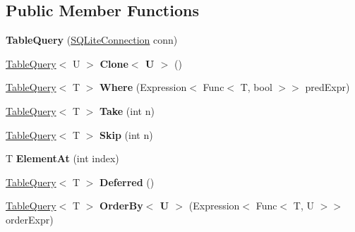 \subsection*{Public Member Functions}
\begin{DoxyCompactItemize}
\item 
\hypertarget{classSQLite_1_1TableQuery_a2e3874f45af10a8c44db821c7a848aab}{}{\bfseries Table\+Query} (\hyperlink{classSQLite_1_1SQLiteConnection}{S\+Q\+Lite\+Connection} conn)\label{classSQLite_1_1TableQuery_a2e3874f45af10a8c44db821c7a848aab}

\item 
\hypertarget{classSQLite_1_1TableQuery_a744de6c9fda8bf39de015ae41c0b2cb3}{}\hyperlink{classSQLite_1_1TableQuery}{Table\+Query}$<$ U $>$ {\bfseries Clone$<$ U $>$} ()\label{classSQLite_1_1TableQuery_a744de6c9fda8bf39de015ae41c0b2cb3}

\item 
\hypertarget{classSQLite_1_1TableQuery_aafcda8a0d85fc7708bc29cc1ae254be5}{}\hyperlink{classSQLite_1_1TableQuery}{Table\+Query}$<$ T $>$ {\bfseries Where} (Expression$<$ Func$<$ T, bool $>$$>$ pred\+Expr)\label{classSQLite_1_1TableQuery_aafcda8a0d85fc7708bc29cc1ae254be5}

\item 
\hypertarget{classSQLite_1_1TableQuery_abc1454c5581e01ee57873a8c59101d5c}{}\hyperlink{classSQLite_1_1TableQuery}{Table\+Query}$<$ T $>$ {\bfseries Take} (int n)\label{classSQLite_1_1TableQuery_abc1454c5581e01ee57873a8c59101d5c}

\item 
\hypertarget{classSQLite_1_1TableQuery_a4bf49d4c603ea8a6db6d65e51bdd6458}{}\hyperlink{classSQLite_1_1TableQuery}{Table\+Query}$<$ T $>$ {\bfseries Skip} (int n)\label{classSQLite_1_1TableQuery_a4bf49d4c603ea8a6db6d65e51bdd6458}

\item 
\hypertarget{classSQLite_1_1TableQuery_a1adf19dc2456239c4b4a900995b2794d}{}T {\bfseries Element\+At} (int index)\label{classSQLite_1_1TableQuery_a1adf19dc2456239c4b4a900995b2794d}

\item 
\hypertarget{classSQLite_1_1TableQuery_a158964fb1e56e6679ab94cf101dcc6b3}{}\hyperlink{classSQLite_1_1TableQuery}{Table\+Query}$<$ T $>$ {\bfseries Deferred} ()\label{classSQLite_1_1TableQuery_a158964fb1e56e6679ab94cf101dcc6b3}

\item 
\hypertarget{classSQLite_1_1TableQuery_ae35684d62851a521aac3419af0c565fb}{}\hyperlink{classSQLite_1_1TableQuery}{Table\+Query}$<$ T $>$ {\bfseries Order\+By$<$ U $>$} (Expression$<$ Func$<$ T, U $>$$>$ order\+Expr)\label{classSQLite_1_1TableQuery_ae35684d62851a521aac3419af0c565fb}


\end{DoxyCompactItemize}
